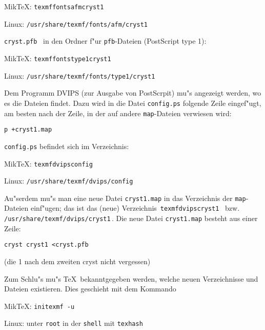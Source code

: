 \documentclass{article}
\begin{document}
MikTeX: \texttt{texmffontsafmcryst1}
 
Linux: \texttt{/usr/share/texmf/fonts/afm/cryst1} 

\vskip3pt
\texttt{cryst.pfb} \ in den Ordner f"ur \texttt{pfb}-Dateien (PostScript type 1):
   
MikTeX: \texttt{texmffontstype1cryst1}
 
Linux: \texttt{/usr/share/texmf/fonts/type1/cryst1} 

\vskip6pt
Dem Programm \textsf{\small DVIPS} (zur Ausgabe von PostScrpit) mu"s angezeigt werden,
wo es die Dateien findet. Dazu wird in die Datei \texttt{config.ps} folgende Zeile eingef"ugt,
am besten nach der Zeile, in der auf andere \texttt{map}-Dateien verwiesen wird:

\vskip6pt
\texttt{p +cryst1.map}

\vskip6pt
\noindent\texttt{config.ps} befindet sich im Verzeichnis:
 
\vskip6pt MikTeX: \texttt{texmfdvipsconfig}

Linux: \texttt{/usr/share/texmf/dvips/config}

\vskip6pt Au"serdem mu"s man eine neue Datei \texttt{cryst1.map} in das Verzeichnis der \texttt{map}-Dateien einf"ugen;
das ist das (neue) Verzeichnis \,\texttt{texmfdvipscryst1} \, bzw.
\texttt{/usr/share/texmf/dvips/cryst1}\,.
Die neue  Datei \texttt{cryst1.map} besteht aus einer Zeile:

\vskip6pt
\texttt{cryst cryst1 <cryst.pfb}

(die 1 nach dem zweiten cryst nicht vergessen)

\vskip6pt
Zum Schlu"s mu"s \TeX\ bekanntgegeben werden, welche neuen Verzeichnisse und Dateien existieren.
Dies geschieht mit dem Kommando 

\vskip6pt
MikTeX: \texttt{initexmf -u}

Linux: unter \texttt{root} in der \texttt{shell} mit \texttt{texhash} 
\end{document}
